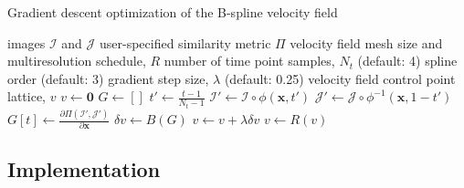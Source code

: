 \documentclass{llncs}
\begin{document}
\begin{algorithm}                    
\caption{Gradient descent optimization of the B-spline velocity field}        
\label{alg1}      
\begin{algorithmic}[1]
\REQUIRE images $\mathcal{I}$ and $\mathcal{J}$
\REQUIRE  user-specified similarity metric $\Pi$ 
\REQUIRE  velocity field mesh size and multiresolution schedule, $R$
\REQUIRE  number of time point samples, $N_t$ (default: 4)
\REQUIRE  spline order (default: 3)
\REQUIRE  gradient step size, $\lambda$ (default: 0.25)
\ENSURE velocity field control point lattice, $v$
\STATE $v \gets \mathbf{0}$ 
  \STATE $G \gets []$  
  \STATE $t' \gets \frac{t-1}{N_t-1}$  
  \STATE $\mathcal{I}' \gets \mathcal{I} \circ \phi(\mathbf{x}, t')$  
  \STATE $\mathcal{J}' \gets \mathcal{J} \circ \phi^{-1}(\mathbf{x}, 1-t')$ 
  \STATE $G[t] \gets \frac{\partial \Pi(\mathcal{I}',\mathcal{J}')}{\partial \mathbf{x}}$  
\ENDFOR  
  \STATE $\delta v \gets B(G)$ 
  \STATE $v \gets v + \lambda\delta v$ 
\ENDFOR  
  \STATE $v \gets R(v)$         
\ENDFOR  
\end{algorithmic}
\end{algorithm}

\subsection{Implementation}
\end{document}
